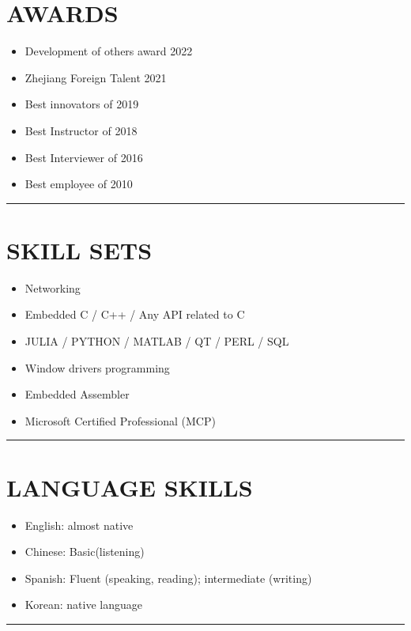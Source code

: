 \documentclass[12pt,a4paper]{article}
\begin{document}
\section{AWARDS}
\begin{itemize}
\item Development of others award 2022


\item Zhejiang Foreign Talent 2021


\item Best innovators of 2019


\item Best Instructor of 2018


\item Best Interviewer of 2016


\item Best employee of 2010

\end{itemize}
\rule{\textwidth}{1pt}
\section{SKILL SETS}
\begin{itemize}
\item Networking


\item Embedded C / C++ / Any API related to C


\item JULIA / PYTHON / MATLAB / QT / PERL / SQL


\item Window drivers programming


\item Embedded Assembler  


\item Microsoft Certified Professional (MCP)

\end{itemize}
\rule{\textwidth}{1pt}
\section{LANGUAGE SKILLS}
\begin{itemize}
\item English: almost native


\item Chinese: Basic(listening)


\item Spanish: Fluent (speaking, reading); intermediate (writing) 


\item Korean: native language

\end{itemize}
\rule{\textwidth}{1pt}
\end{document}

